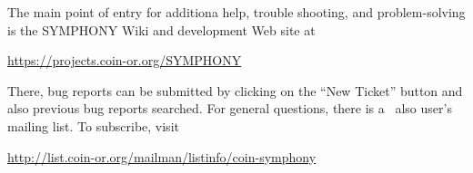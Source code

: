 The main point of entry for additiona help, trouble shooting, and
problem-solving is the SYMPHONY Wiki and development Web site at
\begin{center}
\url{https://projects.coin-or.org/SYMPHONY}
\end{center}
There, bug reports can be submitted by clicking on the ``New Ticket'' button
and also previous bug reports searched. For general questions, there is a \BB\
also user's mailing list. To subscribe, visit
\begin{center}
\url{http://list.coin-or.org/mailman/listinfo/coin-symphony}
\end{center}


